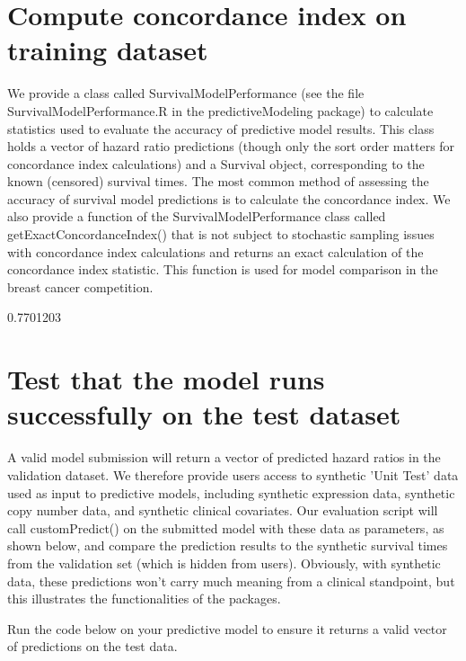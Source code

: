 \documentclass[10pt]{article}
\begin{document}
\section{Compute concordance index on training dataset}
We provide a class called SurvivalModelPerformance (see the file SurvivalModelPerformance.R in the predictiveModeling package) to calculate statistics used to evaluate the accuracy of predictive model results. This class holds a vector of hazard ratio predictions (though only the sort order matters for concordance index calculations) and a Survival object, corresponding to the known (censored) survival times. The most common method of assessing the accuracy of survival model predictions is to calculate the concordance index. We also provide a function of the SurvivalModelPerformance class called getExactConcordanceIndex() that is not subject to stochastic sampling issues with concordance index calculations and returns an exact calculation of the concordance index statistic. This function is used for model comparison in the breast cancer competition.
\begin{Schunk}
\begin{Soutput}
[1] 0.7701203
\end{Soutput}
\end{Schunk}

\section{Test that the model runs successfully on the test dataset}
A valid model submission will return a vector of predicted hazard ratios in the validation dataset. We therefore provide users access to synthetic 'Unit Test' data used as input to predictive models, including synthetic expression data, synthetic copy number data, and synthetic clinical covariates. Our evaluation script will call customPredict() on the submitted model with these data as parameters, as shown below, and compare the prediction results to the synthetic survival times from the validation set (which is hidden from users). Obviously, with synthetic data, these predictions won't carry much meaning from a clinical standpoint, but this illustrates the functionalities of the packages.

Run the code below on your predictive model to ensure it returns a valid vector of predictions on the test data.
\end{document}
